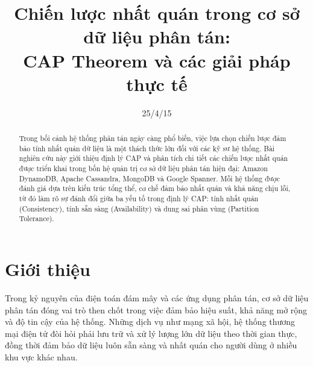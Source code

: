 \documentclass[conference]{IEEEtran}
\begin{document}
\title{Chiến lược nhất quán trong cơ sở dữ liệu phân tán:\\ CAP Theorem và các giải pháp thực tế}


\author{
}
\date{25/4/15}

\maketitle
\begin{abstract}
    
Trong bối cảnh hệ thống phân tán ngày càng phổ biến, việc lựa chọn chiến lược đảm bảo tính nhất quán dữ liệu là một thách thức lớn đối với các kỹ sư hệ thống. Bài nghiên cứu này giới thiệu định lý CAP và phân tích chi tiết các chiến lược nhất quán được triển khai trong bốn hệ quản trị cơ sở dữ liệu phân tán hiện đại: Amazon DynamoDB, Apache Cassandra, MongoDB và Google Spanner. Mỗi hệ thống được đánh giá dựa trên kiến trúc tổng thể, cơ chế đảm bảo nhất quán và khả năng chịu lỗi, từ đó làm rõ sự đánh đổi giữa ba yếu tố trong định lý CAP: tính nhất quán (Consistency), tính sẵn sàng (Availability) và dung sai phân vùng (Partition Tolerance).

\end{abstract}

\section{Giới thiệu}
Trong kỷ nguyên của điện toán đám mây và các ứng dụng phân tán, cơ sở dữ liệu phân tán đóng vai trò then chốt trong việc đảm bảo hiệu suất, khả năng mở rộng và độ tin cậy của hệ thống. Những dịch vụ như mạng xã hội, hệ thống thương mại điện tử đòi hỏi phải lưu trữ và xử lý lượng lớn dữ liệu theo thời gian thực, đồng thời đảm bảo dữ liệu luôn sẵn sàng và nhất quán cho người dùng ở nhiều khu vực khác nhau. 
\end{document}
